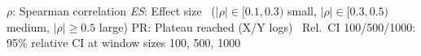 \begin{table}[ht]
{\centering
\vspace{0.5em}
$\rho$: Spearman correlation \quad
\textit{ES}: Effect size~\cite{Cohen2009StatisticalPowerAnalysis} \quad
($|\rho|\in[0.1,0.3)$ small, $|\rho|\in[0.3,0.5)$ medium, $|\rho|\geq 0.5$ large) \quad
PR: Plateau reached (X/Y logs) \
Rel.\ CI 100/500/1000: 95\% relative CI at window sizes 100, 500, 1000
}

\end{table}
